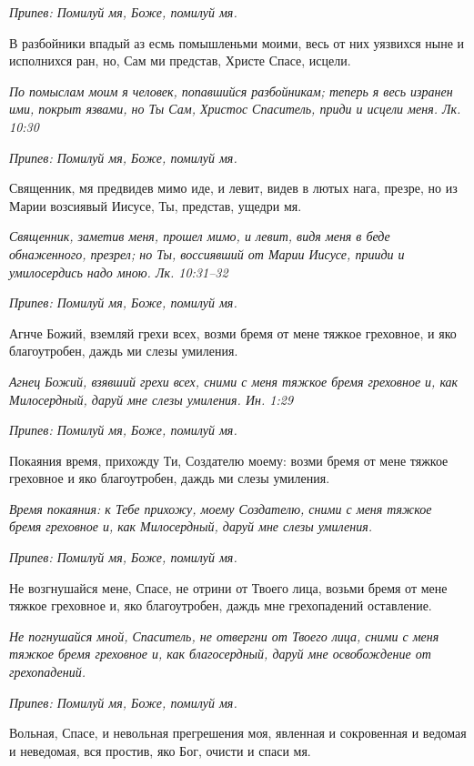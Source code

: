 \itshape Припев:\normalfont{} Помилуй мя, Боже, помилуй мя.


В разбойники впадый аз есмь помышленьми моими, весь от них уязвихся ныне и исполнихся ран, но, Сам ми представ, Христе Спасе, исцели.


\itshape По помыслам моим я человек, попавшийся разбойникам; теперь я весь изранен ими, покрыт язвами, но Ты Сам, Христос Спаситель, приди и исцели меня. Лк. 10:30\normalfont{}


\itshape Припев:\normalfont{} Помилуй мя, Боже, помилуй мя.


Священник, мя предвидев мимо иде, и левит, видев в лютых нага, презре, но из Марии возсиявый Иисусе, Ты, представ, ущедри мя.


\itshape Священник, заметив меня, прошел мимо, и левит, видя меня в беде обнаженного, презрел; но Ты, воссиявший от Марии Иисусе, прииди и умилосердись надо мною. Лк. 10:31–32\normalfont{}


\itshape Припев:\normalfont{} Помилуй мя, Боже, помилуй мя.


Агнче Божий, вземляй грехи всех, возми бремя от мене тяжкое греховное, и яко благоутробен, даждь ми слезы умиления.


\itshape Агнец Божий, взявший грехи всех, сними с меня тяжкое бремя греховное и, как Милосердный, даруй мне слезы умиления. Ин. 1:29\normalfont{}


\itshape Припев:\normalfont{} Помилуй мя, Боже, помилуй мя.


Покаяния время, прихожду Ти, Создателю моему: возми бремя от мене тяжкое греховное и яко благоутробен, даждь ми слезы умиления.


\itshape Время покаяния: к Тебе прихожу, моему Создателю, сними с меня тяжкое бремя греховное и, как Милосердный, даруй мне слезы умиления.\normalfont{}


\itshape Припев:\normalfont{} Помилуй мя, Боже, помилуй мя.


Не возгнушайся мене, Спасе, не отрини от Твоего лица, возьми бремя от мене тяжкое греховное и, яко благоутробен, даждь мне грехопадений оставление.


\itshape Не погнушайся мной, Спаситель, не отвергни от Твоего лица, сними с меня тяжкое бремя греховное и, как благосердный, даруй мне освобождение от грехопадений.\normalfont{}


\itshape Припев:\normalfont{} Помилуй мя, Боже, помилуй мя.


Вольная, Спасе, и невольная прегрешения моя, явленная и сокровенная и ведомая и неведомая, вся простив, яко Бог, очисти и спаси мя.


